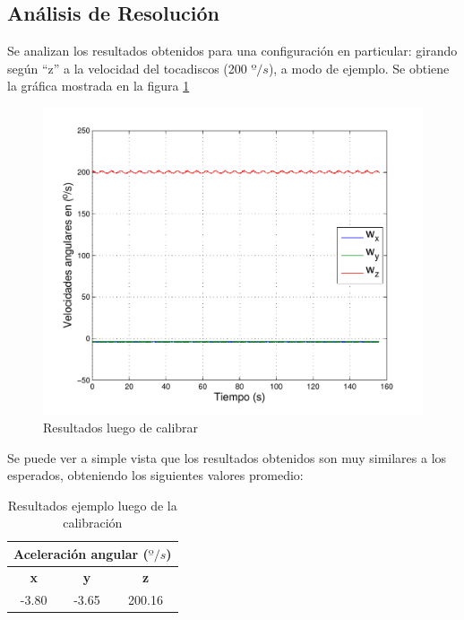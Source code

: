 \documentclass[main]{subfiles}
\begin{document}

\subsection{Análisis de Resolución}

Se analizan los resultados obtenidos para una configuración en particular: girando según ``z'' a la velocidad del tocadiscos (200 $º/s$), a modo de ejemplo. Se obtiene la gráfica mostrada en la figura \ref{fig:wcalibradolejos}

\begin{figure}[h!]
	\centering
	\includegraphics[width=.8\textwidth]{./pics_gyro/wcalibradolejos.pdf}
	\caption{Resultados luego de calibrar}
	\label{fig:wcalibradolejos}
\end{figure}

Se puede ver a simple vista que los resultados obtenidos son muy similares a los esperados, obteniendo los siguientes valores promedio:
\begin{table}[H]
\centering
\begin{small}
\begin{tabular}{|c|c|c|}
\hline
\multicolumn{3}{|c|}{\cellcolor[gray]{0.8} \centering \textbf{Aceleración angular ($º/s$)}}\\ \hline
  {\cellcolor[gray]{0.9} \centering \textbf{x}}
& {\cellcolor[gray]{0.9} \centering \textbf{y}}
& {\cellcolor[gray]{0.9} \centering \textbf{z}} \\ \hline  \hline
-3.80 & -3.65 & 200.16 \\ \hline
\end{tabular}
\caption{Resultados ejemplo luego de la calibración}
\label{tab:resultados-ejemplo}
\end{small}
\end{table} 
\end{document}
